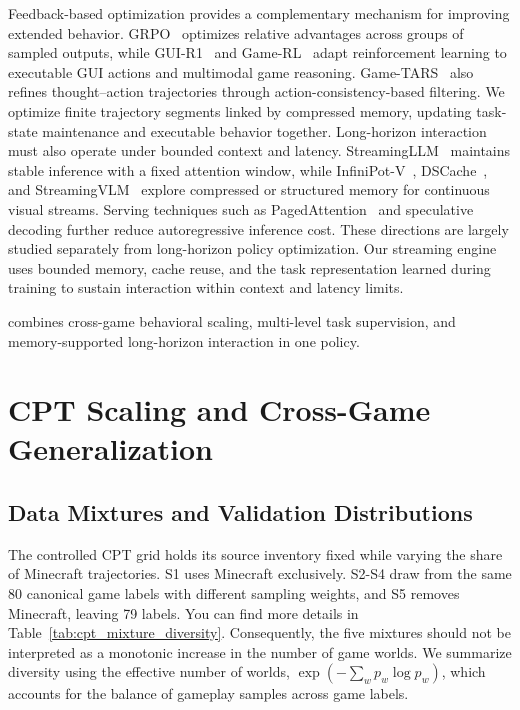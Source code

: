 Feedback-based optimization provides a complementary mechanism for improving extended behavior. GRPO~\cite{shao2024deepseekmath} optimizes relative advantages across groups of sampled outputs, while GUI-R1~\cite{luo2025gui} and Game-RL~\cite{tong2026gamerl} adapt reinforcement learning to executable GUI actions and multimodal game reasoning. Game-TARS~\cite{wang2025gametars} also refines thought–action trajectories through action-consistency-based filtering. We optimize finite trajectory segments linked by compressed memory, updating task-state maintenance and executable behavior together. Long-horizon interaction must also operate under bounded context and latency. StreamingLLM~\cite{xiao2024streamingllm} maintains stable inference with a fixed attention window, while InfiniPot-V~\cite{kim2025infinipotv}, DSCache~\cite{pang2026dscache}, and StreamingVLM~\cite{xu2026streamingvlm} explore compressed or structured memory for continuous visual streams. Serving techniques such as PagedAttention~\cite{kwon2023pagedattention} and speculative decoding further reduce autoregressive inference cost. These directions are largely studied separately from long-horizon policy optimization. Our streaming engine uses bounded memory, cache reuse, and the task representation learned during training to sustain interaction within context and latency limits.

\ourmodel combines cross-game behavioral scaling, multi-level task supervision, and memory-supported long-horizon interaction in one policy.

\section{CPT Scaling and Cross-Game Generalization}
\label{app:cpt_scaling}
\subsection{Data Mixtures and Validation Distributions}
\label{app:cpt_diversity}

The controlled CPT grid holds its source inventory fixed while varying the share of Minecraft trajectories. S1 uses Minecraft exclusively. S2-S4 draw from the same 80 canonical game labels with different sampling weights, and S5 removes Minecraft, leaving 79 labels. You can find more details in Table~\ref{tab:cpt_mixture_diversity}. Consequently, the five mixtures should not be interpreted as a monotonic increase in the number of game worlds. We summarize diversity using the effective number of worlds, $\exp(-\sum_w p_w\log p_w)$, which accounts for the balance of gameplay samples across game labels.

